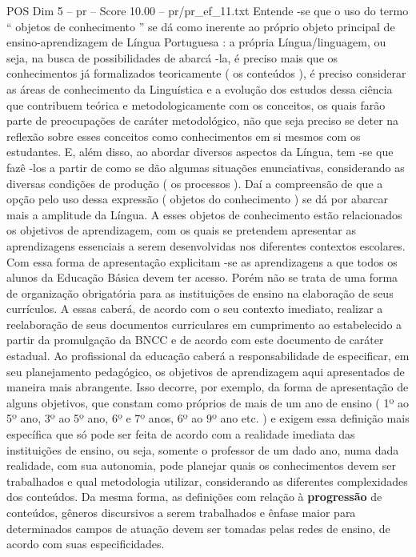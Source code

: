 \begin{textsample}{POS Dim 5 – pr – Score 10.00 – pr/pr\_ef\_11.txt}
Entende -se que o uso do termo “ objetos de conhecimento ” se dá como inerente ao próprio objeto principal de ensino-aprendizagem de Língua Portuguesa : a própria Língua/linguagem, ou seja, na busca de possibilidades de abarcá -la, é preciso mais que os conhecimentos já formalizados teoricamente ( os conteúdos ), é preciso considerar as áreas de conhecimento da Linguística e a evolução dos estudos dessa ciência que contribuem teórica e metodologicamente com os conceitos, os quais farão parte de preocupações de caráter metodológico, não que seja preciso se deter na reflexão sobre esses conceitos como conhecimentos em si mesmos com os estudantes.
E, além disso, ao abordar diversos aspectos da Língua, tem -se que fazê -los a partir de como se dão algumas situações enunciativas, considerando as diversas condições de produção ( os processos ).
Daí a compreensão de que a opção pelo uso dessa expressão ( objetos do conhecimento ) se dá por abarcar mais a amplitude da Língua.
A esses objetos de conhecimento estão relacionados os objetivos de aprendizagem, com os quais se pretendem apresentar as aprendizagens essenciais a serem desenvolvidas nos diferentes contextos escolares.
Com essa forma de apresentação explicitam -se as aprendizagens a que todos os alunos da Educação Básica devem ter acesso.
Porém não se trata de uma forma de organização obrigatória para as instituições de ensino na elaboração de seus currículos.
A essas caberá, de acordo com o seu contexto imediato, realizar a reelaboração de seus documentos curriculares em cumprimento ao estabelecido a partir da promulgação da BNCC e de acordo com este documento de caráter estadual.
Ao profissional da educação caberá a responsabilidade de especificar, em seu planejamento pedagógico, os objetivos de aprendizagem aqui apresentados de maneira mais abrangente.
Isso decorre, por exemplo, da forma de apresentação de alguns objetivos, que constam como próprios de mais de um ano de ensino ( 1º ao 5º ano, 3º ao 5º ano, 6º e 7º anos, 6º ao 9º ano etc. ) e exigem essa definição mais específica que só pode ser feita de acordo com a realidade imediata das instituições de ensino, ou seja, somente o professor de um dado ano, numa dada realidade, com sua autonomia, pode planejar quais os conhecimentos devem ser trabalhados e qual metodologia utilizar, considerando as diferentes complexidades dos conteúdos.
Da mesma forma, as definições com relação à \textbf{progressão} de conteúdos, gêneros discursivos a serem trabalhados e ênfase maior para determinados campos de atuação devem ser tomadas pelas redes de ensino, de acordo com suas especificidades.

\end{textsample}
